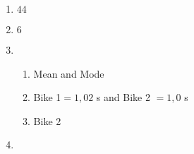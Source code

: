 {\begin{multicols}{3}
\begin{enumerate}[noitemsep, label=\textbf{\arabic*}.]
  \item $44$ %

  \item $6$%

  \item %

    
\begin{enumerate}[noitemsep, label=\textbf{(\alph*)} ]
    \item Mean and Mode%
    \item Bike 1$ = 1,02$ s and Bike 2 $ =1,0$ s%
    \item Bike 2%
    \end{enumerate}

  \item %


\end{enumerate}
\end{multicols}}
